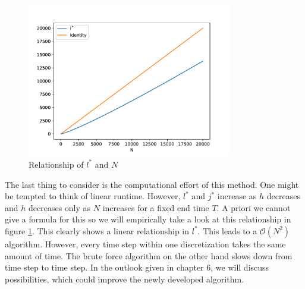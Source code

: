 \documentclass[12pt,a4paper,twoside, open=right]{scrreprt}
\theoremstyle{definition}
\theoremstyle{plain}
\begin{document}
\begin{figure}
    \centering
    \includegraphics[width=0.8\textwidth]{runtime.pdf}
    \caption{Relationship of $l^*$ and $N$}
    \label{fig:runtime}
\end{figure}
The last thing to consider is the computational effort of this method. One might be tempted to think of linear runtime. However, $l^*$ and $j^*$ increase as $h$ decreases and $h$ decreases only as $N$ increases for a fixed end time $T$. A priori we cannot give a formula for this so we will empirically take a look at this relationship in figure \ref{fig:runtime}. This clearly shows a linear relationship in $l^*$. This leads to a $\mathcal{O}(N^2)$ algorithm. However, every time step within one discretization takes the same amount of time. The brute force algorithm on the other hand slows down from time step to time step. In the outlook given in chapter 6, we will discuss possibilities, which could improve the newly developed algorithm.
\end{document}
